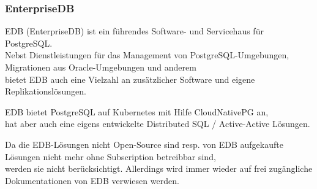 
\begin{flushleft}
    \subsubsection{EnterpriseDB}
    EDB (EnterpriseDB) ist ein führendes Software- und Servicehaus für PostgreSQL\cite{UIY9LXTF}.\\
    Nebst Dienstleistungen für das Management von PostgreSQL-Umgebungen, Migrationen aus Oracle-Umgebungen und anderem\\
    bietet EDB auch eine Vielzahl an zusätzlicher Software und eigene Replikationslösungen.\\
\end{flushleft}
\begin{flushleft}
    EDB bietet PostgreSQL auf Kubernetes mit Hilfe CloudNativePG an,\\
    hat aber auch eine eigens entwickelte Distributed SQL / Active-Active Lösungen.
\end{flushleft}
\begin{flushleft}
    Da die EDB-Lösungen nicht Open-Source sind resp. von EDB aufgekaufte Lösungen nicht mehr ohne Subscription betreibbar sind,\\
    werden sie nicht berücksichtigt.
    Allerdings wird immer wieder auf frei zugängliche Dokumentationen von EDB verwiesen werden.
\end{flushleft}